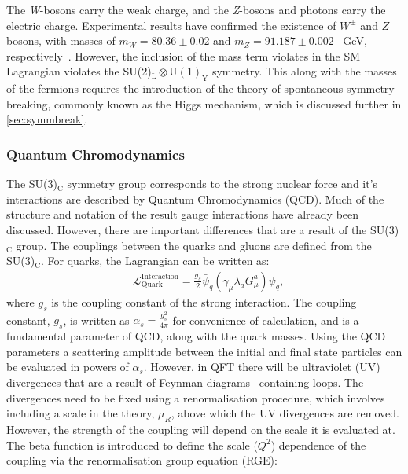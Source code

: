 The \emph{W}-bosons carry the weak charge, and the \emph{Z}-bosons and photons carry the electric charge. Experimental results have confirmed the existence of $W^\pm$ and $Z$ bosons, with masses of $m_W = 80.36 \pm 0.02$ and $m_Z = 91.187 \pm 0.002$ \SI{}{\giga\electronvolt}, respectively~\cite{PDG}. However, the inclusion of the mass term violates in the SM Lagrangian violates the SU(2)$_\mathrm{L} \otimes \mathrm{U(1)}_\mathrm{Y}$ symmetry. This along with the masses of the fermions requires the introduction of the theory of spontaneous symmetry breaking, commonly known as the Higgs mechanism, which is discussed further in \cref{sec:symmbreak}.

\subsubsection{Quantum Chromodynamics}
The SU(3)$_\mathrm{C}$ symmetry group corresponds to the strong nuclear force and it's interactions are described by Quantum Chromodynamics (QCD). Much of the structure and notation of the result gauge interactions have already been discussed. However, there are important differences that are a result of the SU(3)$_\mathrm{C}$ group. The couplings between the quarks and gluons are defined from the SU(3)$_\mathrm{C}$. For quarks, the Lagrangian can be written as: 
\begin{equation}
    \label{eq:lagrangianQuark}
    \begin{aligned}
        & \mathcal{L}_\mathrm{Quark}^\mathrm{Interaction} = \frac{g_s}{2}\bar{\psi}_q \left(\gamma_\mu \lambda_a G_\mu^a \right)\psi_q ,
     \end{aligned}
\end{equation}
where $g_s$ is the coupling constant of the strong interaction. The coupling constant, $g_s$, is written as $\alpha_s = \frac{g_s^2}{4\pi}$ for convenience of calculation, and is a fundamental parameter of QCD, along with the quark masses. Using the QCD parameters a scattering amplitude between the initial and final state particles can be evaluated in powers of $\alpha_s$. However, in QFT there will be ultraviolet (UV) divergences that are a result of Feynman diagrams~\cite{Thomson:2013zua} containing loops. The divergences need to be fixed using a renormalisation procedure, which involves including a scale in the theory, $\mu_R$, above which the UV divergences are removed. However, the strength of the coupling will depend on the scale it is evaluated at. The beta function is introduced to define the scale ($Q^2$) dependence of the coupling via the renormalisation group equation (RGE):
